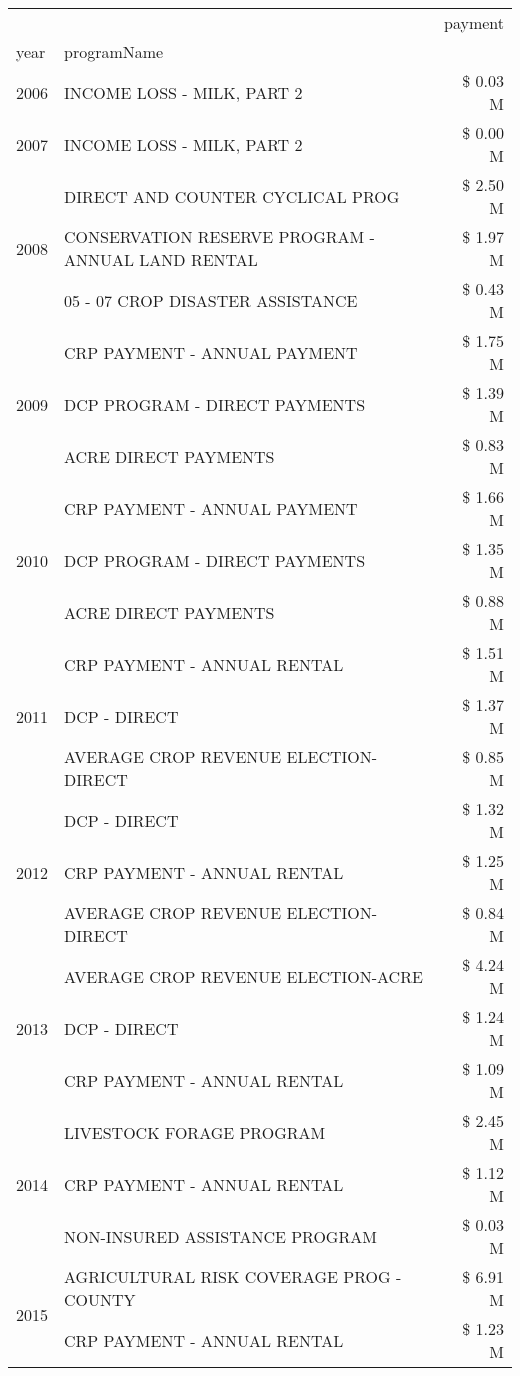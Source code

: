 \begin{tabular}{llr}
\toprule
 &  & payment \\
year & programName &  \\
\midrule
2006 & INCOME LOSS - MILK, PART 2 & \$ 0.03 M \\
\cline{1-3}
2007 & INCOME LOSS - MILK, PART 2 & \$ 0.00 M \\
\cline{1-3}
\multirow[t]{3}{*}{2008} & DIRECT AND COUNTER CYCLICAL PROG & \$ 2.50 M \\
 & CONSERVATION RESERVE PROGRAM - ANNUAL LAND RENTAL & \$ 1.97 M \\
 & 05 - 07 CROP DISASTER ASSISTANCE & \$ 0.43 M \\
\cline{1-3}
\multirow[t]{3}{*}{2009} & CRP PAYMENT - ANNUAL PAYMENT & \$ 1.75 M \\
 & DCP PROGRAM - DIRECT PAYMENTS & \$ 1.39 M \\
 & ACRE DIRECT PAYMENTS & \$ 0.83 M \\
\cline{1-3}
\multirow[t]{3}{*}{2010} & CRP PAYMENT - ANNUAL PAYMENT & \$ 1.66 M \\
 & DCP PROGRAM - DIRECT PAYMENTS & \$ 1.35 M \\
 & ACRE DIRECT PAYMENTS & \$ 0.88 M \\
\cline{1-3}
\multirow[t]{3}{*}{2011} & CRP PAYMENT - ANNUAL RENTAL & \$ 1.51 M \\
 & DCP - DIRECT & \$ 1.37 M \\
 & AVERAGE CROP REVENUE ELECTION-DIRECT & \$ 0.85 M \\
\cline{1-3}
\multirow[t]{3}{*}{2012} & DCP - DIRECT & \$ 1.32 M \\
 & CRP PAYMENT - ANNUAL RENTAL & \$ 1.25 M \\
 & AVERAGE CROP REVENUE ELECTION-DIRECT & \$ 0.84 M \\
\cline{1-3}
\multirow[t]{3}{*}{2013} & AVERAGE CROP REVENUE ELECTION-ACRE & \$ 4.24 M \\
 & DCP - DIRECT & \$ 1.24 M \\
 & CRP PAYMENT - ANNUAL RENTAL & \$ 1.09 M \\
\cline{1-3}
\multirow[t]{3}{*}{2014} & LIVESTOCK FORAGE PROGRAM & \$ 2.45 M \\
 & CRP PAYMENT - ANNUAL RENTAL & \$ 1.12 M \\
 & NON-INSURED ASSISTANCE PROGRAM & \$ 0.03 M \\
\cline{1-3}
\multirow[t]{3}{*}{2015} & AGRICULTURAL RISK COVERAGE PROG - COUNTY & \$ 6.91 M \\
 & CRP PAYMENT - ANNUAL RENTAL & \$ 1.23 M \\

\end{tabular}
